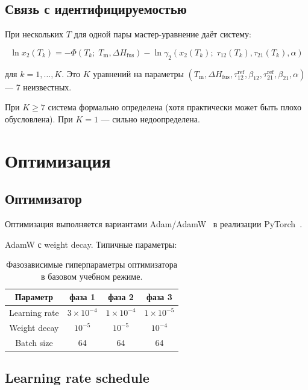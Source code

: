 \documentclass[11pt]{article}
\begin{document}
\subsection{Связь с идентифицируемостью}

При нескольких $T$ для одной пары мастер-уравнение даёт систему:

\begin{equation*}
\ln x_2(T_k) = -\Phi(T_k;\; T_{\mathrm{m}}, \Delta H_{\mathrm{fus}}) - \ln\gamma_2(x_2(T_k);\; \tau_{12}(T_k), \tau_{21}(T_k), \alpha)
\end{equation*}

для $k = 1, \ldots, K$. Это $K$ уравнений на параметры $(T_{\mathrm{m}}, \Delta H_{\mathrm{fus}}, \tau_{12}^{\mathrm{ref}}, \beta_{12}, \tau_{21}^{\mathrm{ref}}, \beta_{21}, \alpha)$ --- 7 неизвестных.

При $K \geq 7$ система формально определена (хотя практически может быть плохо обусловлена). При $K = 1$ --- сильно недоопределена.

\section{Оптимизация}

\subsection{Оптимизатор}

Оптимизация выполняется вариантами Adam/AdamW~\cite{kingma2015,loshchilov2019} в реализации PyTorch~\cite{paszke2019}.

AdamW с weight decay. Типичные параметры:

\begin{table}[H]
\centering
\begin{tabular}{|c|c|c|c|}
\hline
Параметр & фаза 1 & фаза 2 & фаза 3 \\
\hline
Learning rate & $3 \times 10^{-4}$ & $1 \times 10^{-4}$ & $1 \times 10^{-5}$ \\
\hline
Weight decay & $10^{-5}$ & $10^{-5}$ & $10^{-4}$ \\
\hline
Batch size & 64 & 64 & 64 \\
\hline
\end{tabular}
\caption{Фазозависимые гиперпараметры оптимизатора в базовом учебном режиме.}
\label{tab:optimizer-phase-hparams}
\end{table}

\subsection{Learning rate schedule}
\end{document}
